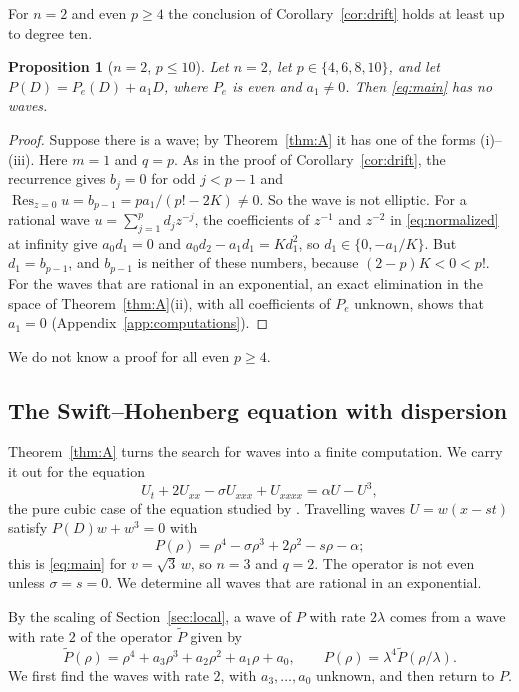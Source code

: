 \documentclass[11pt]{article}
\newtheorem{proposition}[theorem]{Proposition}
\theoremstyle{definition}
\theoremstyle{remark}
\numberwithin{equation}{section}
\DeclareMathOperator{\Res}{Res}
\begin{document}
For \(n=2\) and even \(p\ge4\) the conclusion of
Corollary~\ref{cor:drift} holds at least up to degree ten.

\begin{proposition}[\(n=2\), \(p\le10\)]\label{prop:drift-n2}
Let \(n=2\), let \(p\in\{4,6,8,10\}\), and let \(P(D)=P_e(D)+a_1D\),
where \(P_e\) is even and \(a_1\ne0\). Then \eqref{eq:main} has no
waves.
\end{proposition}

\begin{proof}
Suppose there is a wave; by Theorem~\ref{thm:A} it has one of the
forms (i)--(iii). Here \(m=1\) and \(q=p\). As in the proof of
Corollary~\ref{cor:drift}, the recurrence gives \(b_j=0\) for odd
\(j<p-1\) and
\(\Res_{z=0}u=b_{p-1}=pa_1/(p!-2K)\ne0\). So the wave is not elliptic.
For a rational wave \(u=\sum_{j=1}^{p}d_jz^{-j}\), the coefficients of
\(z^{-1}\) and \(z^{-2}\) in \eqref{eq:normalized} at infinity give
\(a_0d_1=0\) and \(a_0d_2-a_1d_1=Kd_1^2\), so
\(d_1\in\{0,-a_1/K\}\). But \(d_1=b_{p-1}\), and \(b_{p-1}\) is neither
of these numbers, because \((2-p)K<0<p!\). For the waves that are
rational in an exponential, an exact elimination in the space of
Theorem~\ref{thm:A}(ii), with all coefficients of \(P_e\) unknown,
shows that \(a_1=0\) (Appendix~\ref{app:computations}).
\end{proof}

We do not know a proof for all even \(p\ge4\).

\subsection{The Swift--Hohenberg equation with dispersion}\label{sec:sh}

Theorem~\ref{thm:A} turns the search for waves into a finite
computation. We carry it out for the equation
\[
 U_t+2U_{xx}-\sigma U_{xxx}+U_{xxxx}=\alpha U-U^3 ,
\]
the pure cubic case of the equation studied by
\citet{KudryashovSinelshchikov2012SH}. Travelling waves \(U=w(x-st)\)
satisfy \(P(D)w+w^3=0\) with
\[
 P(\rho)=\rho^4-\sigma\rho^3+2\rho^2-s\rho-\alpha ;
\]
this is \eqref{eq:main} for \(v=\sqrt3\,w\), so \(n=3\) and \(q=2\).
The operator is not even unless \(\sigma=s=0\). We determine all waves
that are rational in an exponential.

By the scaling of Section~\ref{sec:local}, a wave of \(P\) with rate
\(2\lambda\) comes from a wave with rate \(2\) of the operator
\(\widetilde P\) given by
\[
 \widetilde P(\rho)=\rho^4+a_3\rho^3+a_2\rho^2+a_1\rho+a_0,\qquad
 P(\rho)=\lambda^4\widetilde P(\rho/\lambda).
\]
We first find the waves with rate \(2\), with \(a_3,\dots,a_0\)
unknown, and then return to \(P\).
\end{document}
